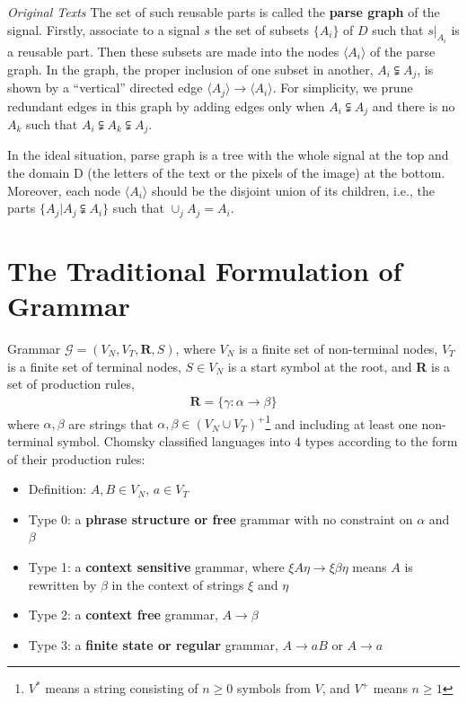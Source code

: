 \documentclass[10pt,oneside]{book}
\newenvironment{book_quote}[1]
{%
  \mdfsetup{%
    frametitle={\colorbox{white}{\space#1\space}},
    frametitleaboveskip=-\ht\strutbox,
  }
  \begin{mdframed}
}
{
  \end{mdframed}
}
\begin{document}
\begin{book_quote}{\textit{Original Texts}}
  The set of such reusable parts is called the \textbf{parse graph} of the
  signal. Firstly, associate to a signal $s$ the set of subsets $\{A_i\}$ of
  $D$ such that $s\vert_{A_i}$ is a reusable part. Then these subsets are made
  into the nodes $\langle A_i \rangle$ of the parse graph. In the graph, the
  proper inclusion of one subset in another, $A_i \subsetneqq A_j$, is shown by
  a ``vertical'' directed edge
  $\langle A_j \rangle \rightarrow \langle A_i \rangle$. For simplicity, we
  prune redundant edges in this graph by adding edges only when
  $A_i \subsetneqq A_j$ and there is no $A_k$ such that
  $A_i \subsetneqq A_k \subsetneqq A_j$.

  \par
  In the ideal situation, parse graph is a tree with the whole signal at the
  top and the domain D (the letters of the text or the pixels of the image) at
  the bottom. Moreover, each node $\langle A_i \rangle$ should be the disjoint
  union of its children, i.e., the parts $\{A_j \vert A_j \subsetneqq A_i\}$
  such that $\cup_j A_j = A_i$.
\end{book_quote}

\section{The Traditional Formulation of Grammar}%
\label{sec:ii.1.2}
Grammar $\mathcal{G} = (V_N, V_T, \mathbf{R}, S)$, where $V_N$ is a finite
set of non-terminal nodes, $V_T$ is a finite set of terminal nodes, $S \in V_N$
is a start symbol at the root, and \textbf{R} is a set of production rules,
%
\begin{align}
  \label{eq:ii.1.2}
  \mathbf{R} = \{\gamma: \alpha \rightarrow \beta\}
\end{align}
%
where $\alpha, \beta$ are strings that
$\alpha, \beta \in {(V_N \cup V_T)}^+$\footnote{$V^*$ means a string consisting
of $n \geq 0$ symbols from $V$, and $V^+$ means $n \geq 1$} and including at
least one non-terminal symbol. Chomsky classified languages into 4 types
according to the form of their production rules:
%
\begin{itemize}
  \item Definition: $A, B \in V_N$, $a \in V_T$
  \item Type 0: a \textbf{phrase structure or free} grammar with no constraint
    on $\alpha$ and $\beta$
  \item Type 1: a \textbf{context sensitive} grammar, where
    $\xi A \eta \rightarrow \xi \beta \eta$ means $A$ is rewritten by $\beta$
    in the context of strings $\xi$ and $\eta$
  \item Type 2: a \textbf{context free} grammar, $A \rightarrow \beta$
  \item Type 3: a \textbf{finite state or regular} grammar,
    $A \rightarrow aB$ or $A \rightarrow a$
\end{itemize}
%
\end{document}
